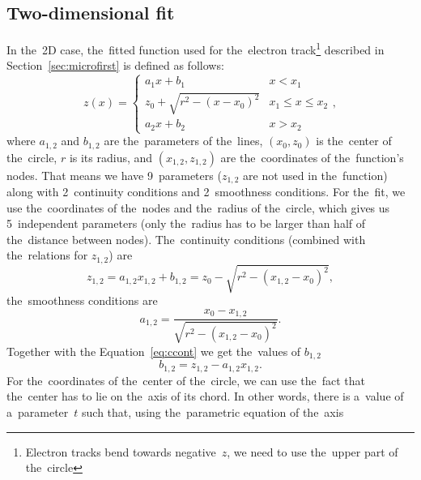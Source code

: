 		\subsection{Two-dimensional fit}
			In the~2D case, the~fitted function used for the~electron track\footnote{Electron tracks bend towards negative~$z$, we need to use the~upper part of the~circle} described in Section~\ref{sec:microfirst} is defined as follows:
				\begin{equation}
					\label{eq:clines2d}
					z(x) = \begin{cases}
								a_1x+b_1 & x<x_1\\
								z_0+\sqrt{r^2-(x-x_0)^2} & x_1\leq x\leq x_2\\
								a_2x+b_2 & x>x_2
						   \end{cases},
				\end{equation}
			where $a_{1,2}$ and $b_{1,2}$ are the~parameters of the~lines, $(x_0,z_0)$ is the~center of the~circle, $r$ is its radius, and $(x_{1,2},z_{1,2})$ are the~coordinates of the~function's nodes. That means we have 9~parameters ($z_{1,2}$ are not used in the~function) along with 2~continuity conditions and 2~smoothness conditions. For the~fit, we use the~coordinates of the~nodes and the~radius of the~circle, which gives us 5~independent parameters (only the~radius has to be larger than half of the~distance between nodes). The~continuity conditions (combined with the~relations for $z_{1,2}$) are
				\begin{equation}
					\label{eq:ccont}
					z_{1,2} = a_{1,2}x_{1,2}+b_{1,2} = z_0-\sqrt{r^2-(x_{1,2}-x_0)^2},
				\end{equation}
			the~smoothness conditions are
				\begin{equation}
					\label{eq:a12}
					a_{1,2} = \frac{x_0-x_{1,2}}{\sqrt{r^2-(x_{1,2}-x_0)^2}}.
				\end{equation}
			Together with the Equation~\ref{eq:ccont} we get the~values of $b_{1,2}$
				\begin{equation}
					\label{eq:b12}
					b_{1,2} = z_{1,2} - a_{1,2} x_{1,2}.
				\end{equation}
			For the~coordinates of the~center of the~circle, we can use the~fact that the~center has to lie on the~axis of its chord. In other words, there is a~value of a~parameter~$t$ such that, using the~parametric equation of the~axis
